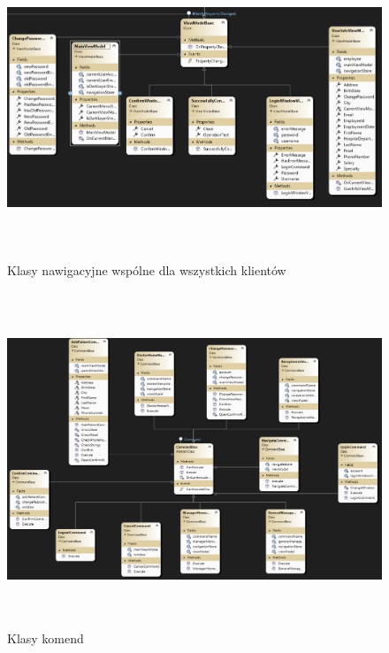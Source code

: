 \begin{figure}[H]
\begin{center}
    \includegraphics[height=9cm]{images/diag_kl_nav_wszt.png}
    \caption{Klasy nawigacyjne wspólne dla wszystkich klientów}
\end{center}
\end{figure}

\begin{figure}[H]
\begin{center}
    \includegraphics[height=10cm]{images/diag_kl_kom.png}
    \caption{Klasy komend}
\end{center}
\end{figure}

